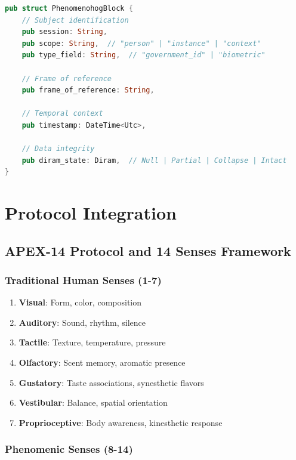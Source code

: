 \documentclass[12pt,a4paper]{report}
\theoremstyle{definition}
\begin{document}
\begin{lstlisting}[language=Rust, caption=Phenomenohog Block]
pub struct PhenomenohogBlock {
    // Subject identification
    pub session: String,
    pub scope: String,  // "person" | "instance" | "context"
    pub type_field: String,  // "government_id" | "biometric"
    
    // Frame of reference
    pub frame_of_reference: String,
    
    // Temporal context
    pub timestamp: DateTime<Utc>,
    
    // Data integrity
    pub diram_state: Diram,  // Null | Partial | Collapse | Intact
}
\end{lstlisting}


\part{Protocol Integration}

\chapter{APEX-14 Protocol and 14 Senses Framework}

\section{Traditional Human Senses (1-7)}

\begin{enumerate}
    \item \textbf{Visual}: Form, color, composition
    \item \textbf{Auditory}: Sound, rhythm, silence
    \item \textbf{Tactile}: Texture, temperature, pressure
    \item \textbf{Olfactory}: Scent memory, aromatic presence
    \item \textbf{Gustatory}: Taste associations, synesthetic flavors
    \item \textbf{Vestibular}: Balance, spatial orientation
    \item \textbf{Proprioceptive}: Body awareness, kinesthetic response
\end{enumerate}

\section{Phenomenic Senses (8-14)}
\end{document}
